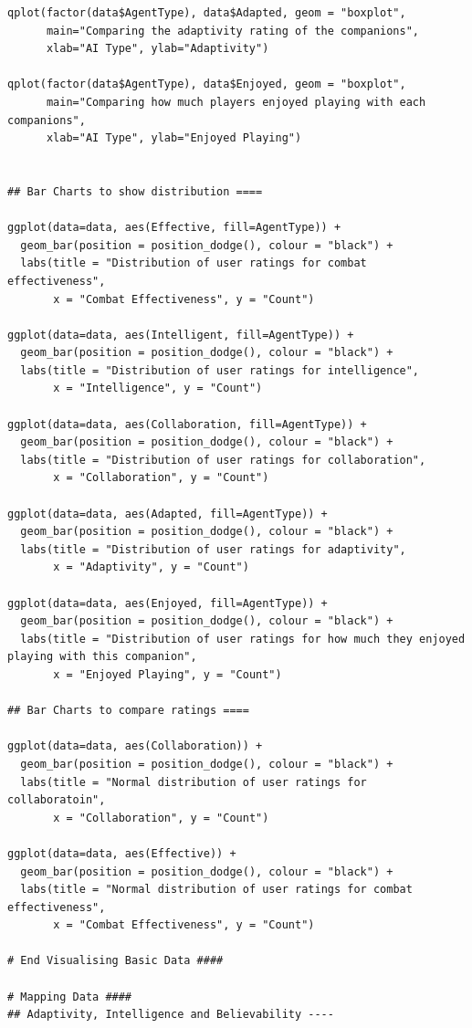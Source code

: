 \documentclass{IEEEtran}
\begin{document}
\begin{verbatim}
qplot(factor(data$AgentType), data$Adapted, geom = "boxplot", 
      main="Comparing the adaptivity rating of the companions", 
      xlab="AI Type", ylab="Adaptivity")

qplot(factor(data$AgentType), data$Enjoyed, geom = "boxplot", 
      main="Comparing how much players enjoyed playing with each companions", 
      xlab="AI Type", ylab="Enjoyed Playing")


## Bar Charts to show distribution ====

ggplot(data=data, aes(Effective, fill=AgentType)) +
  geom_bar(position = position_dodge(), colour = "black") +
  labs(title = "Distribution of user ratings for combat effectiveness",
       x = "Combat Effectiveness", y = "Count")

ggplot(data=data, aes(Intelligent, fill=AgentType)) +
  geom_bar(position = position_dodge(), colour = "black") +
  labs(title = "Distribution of user ratings for intelligence",
       x = "Intelligence", y = "Count")

ggplot(data=data, aes(Collaboration, fill=AgentType)) +
  geom_bar(position = position_dodge(), colour = "black") +
  labs(title = "Distribution of user ratings for collaboration",
       x = "Collaboration", y = "Count")

ggplot(data=data, aes(Adapted, fill=AgentType)) +
  geom_bar(position = position_dodge(), colour = "black") +
  labs(title = "Distribution of user ratings for adaptivity",
       x = "Adaptivity", y = "Count")

ggplot(data=data, aes(Enjoyed, fill=AgentType)) +
  geom_bar(position = position_dodge(), colour = "black") +
  labs(title = "Distribution of user ratings for how much they enjoyed playing with this companion",
       x = "Enjoyed Playing", y = "Count")

## Bar Charts to compare ratings ====

ggplot(data=data, aes(Collaboration)) +
  geom_bar(position = position_dodge(), colour = "black") +
  labs(title = "Normal distribution of user ratings for collaboratoin",
       x = "Collaboration", y = "Count")

ggplot(data=data, aes(Effective)) +
  geom_bar(position = position_dodge(), colour = "black") +
  labs(title = "Normal distribution of user ratings for combat effectiveness",
       x = "Combat Effectiveness", y = "Count")

# End Visualising Basic Data ####

# Mapping Data ####
## Adaptivity, Intelligence and Believability ----


\end{verbatim}
\end{document}
